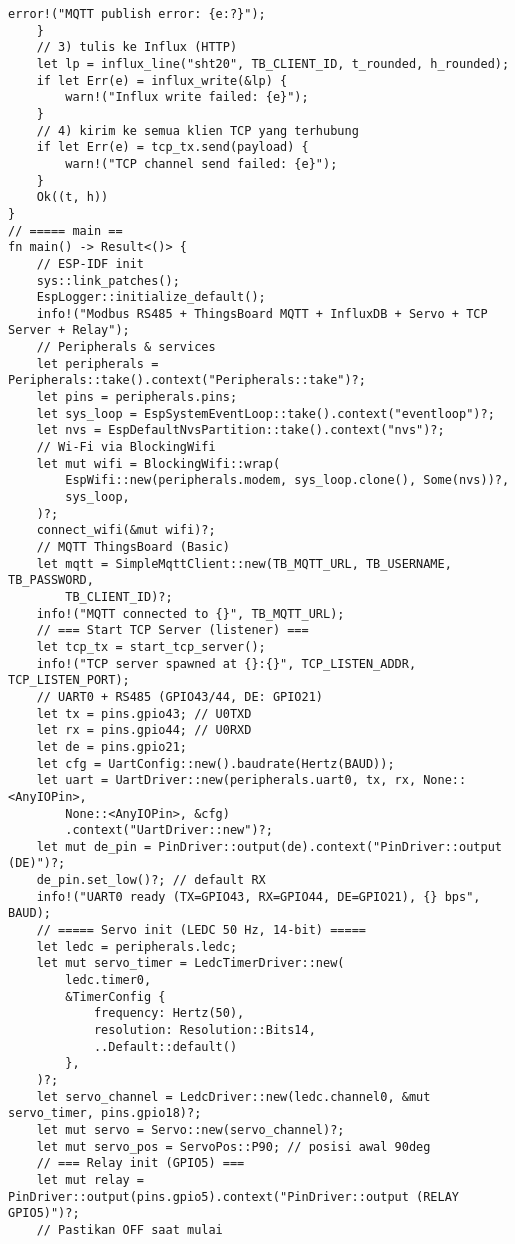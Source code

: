 \documentclass[a4paper, 12pt]{article}
\begin{document}
\begin{lstlisting}[style=ruststyle, caption={main.rs}, basicstyle=\ttfamily\tiny]
        error!("MQTT publish error: {e:?}");
    }
    // 3) tulis ke Influx (HTTP)
    let lp = influx_line("sht20", TB_CLIENT_ID, t_rounded, h_rounded);
    if let Err(e) = influx_write(&lp) {
        warn!("Influx write failed: {e}");
    }
    // 4) kirim ke semua klien TCP yang terhubung
    if let Err(e) = tcp_tx.send(payload) {
        warn!("TCP channel send failed: {e}");
    }
    Ok((t, h))
}
// ===== main ==
fn main() -> Result<()> {
    // ESP-IDF init
    sys::link_patches();
    EspLogger::initialize_default();
    info!("Modbus RS485 + ThingsBoard MQTT + InfluxDB + Servo + TCP Server + Relay");
    // Peripherals & services
    let peripherals = Peripherals::take().context("Peripherals::take")?;
    let pins = peripherals.pins;
    let sys_loop = EspSystemEventLoop::take().context("eventloop")?;
    let nvs = EspDefaultNvsPartition::take().context("nvs")?;
    // Wi-Fi via BlockingWifi
    let mut wifi = BlockingWifi::wrap(
        EspWifi::new(peripherals.modem, sys_loop.clone(), Some(nvs))?,
        sys_loop,
    )?;
    connect_wifi(&mut wifi)?;
    // MQTT ThingsBoard (Basic)
    let mqtt = SimpleMqttClient::new(TB_MQTT_URL, TB_USERNAME, TB_PASSWORD,
        TB_CLIENT_ID)?;
    info!("MQTT connected to {}", TB_MQTT_URL);
    // === Start TCP Server (listener) ===
    let tcp_tx = start_tcp_server();
    info!("TCP server spawned at {}:{}", TCP_LISTEN_ADDR, TCP_LISTEN_PORT);
    // UART0 + RS485 (GPIO43/44, DE: GPIO21)
    let tx = pins.gpio43; // U0TXD
    let rx = pins.gpio44; // U0RXD
    let de = pins.gpio21;
    let cfg = UartConfig::new().baudrate(Hertz(BAUD));
    let uart = UartDriver::new(peripherals.uart0, tx, rx, None::<AnyIOPin>,
        None::<AnyIOPin>, &cfg)
        .context("UartDriver::new")?;
    let mut de_pin = PinDriver::output(de).context("PinDriver::output (DE)")?;
    de_pin.set_low()?; // default RX
    info!("UART0 ready (TX=GPIO43, RX=GPIO44, DE=GPIO21), {} bps", BAUD);
    // ===== Servo init (LEDC 50 Hz, 14-bit) =====
    let ledc = peripherals.ledc;
    let mut servo_timer = LedcTimerDriver::new(
        ledc.timer0,
        &TimerConfig {
            frequency: Hertz(50),
            resolution: Resolution::Bits14,
            ..Default::default()
        },
    )?;
    let servo_channel = LedcDriver::new(ledc.channel0, &mut servo_timer, pins.gpio18)?;
    let mut servo = Servo::new(servo_channel)?;
    let mut servo_pos = ServoPos::P90; // posisi awal 90deg
    // === Relay init (GPIO5) ===
    let mut relay = PinDriver::output(pins.gpio5).context("PinDriver::output (RELAY GPIO5)")?;
    // Pastikan OFF saat mulai

\end{lstlisting}
\end{document}
